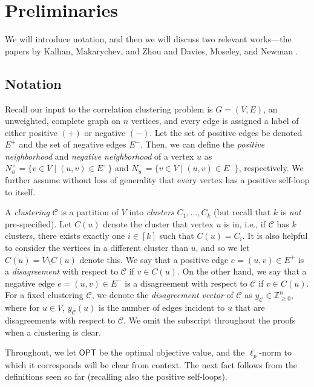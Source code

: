 \section{Preliminaries}

We will introduce notation, 
and then we will discuss two relevant works---the papers by 
Kalhan, Makarychev, and Zhou \citeyearpar{KMZ19} and Davies, Moseley, and Newman \citeyearpar{DMN23}.

\subsection{Notation} \label{sec: notation}
Recall our input to the correlation clustering problem is 
$G=(V,E)$, an unweighted, complete graph on $n$ vertices, 
and every edge is assigned a label of either positive $(+)$ or negative $(-)$.
Let the set of positive edges be denoted $E^+$ and the set of negative edges $E^-$.
Then, we can define the \emph{positive neighborhood} and \emph{negative neighborhood} of a vertex $u$ as $N_u^+ =\{v\in V \mid (u,v) \in E^+\}$ and $N_u^- =\{v\in V \mid (u,v) \in E^-\}$, respectively.
We further assume without loss of generality that every vertex has a positive self-loop to itself.

A \emph{clustering} $\mathcal{C}$ is a partition of $V$ into \emph{clusters} $C_1,\ldots,C_k$ (but recall that $k$ is \textit{not} pre-specified). 
Let $C(u)$ denote the cluster that vertex $u$ is in, i.e., if $\mathcal{C}$ has $k$ clusters, there exists exactly one $i \in [k]$ such that $C(u) = C_i$.
It is also helpful to consider the vertices in a different cluster than $u$, and so we let $\overline{C(u)} = V \setminus C(u)$ denote this.
We say that a positive edge $e=(u,v) \in E^+$ is a \emph{disagreement} with respect to $\mathcal{C}$ if $v \in \overline{C(u)}$. On the other hand, we say that a negative edge $e=(u,v) \in E^-$ is a disagreement with respect to $\mathcal{C}$ if $v \in C(u)$.
For a fixed clustering $\mathcal{C}$, we denote the \emph{disagreement vector} of $\mathcal{C}$ as $y_{\mathcal{C}} \in \mathbb{Z}_{\geq 0}^n$, where for $u \in V$, $y_{\mathcal{C}}(u)$ is the number of edges incident to $u$ that are disagreements with respect to $\mathcal{C}$. We omit the subscript throughout the proofs when a clustering is clear.

Throughout, we let $\textsf{OPT}$ be the optimal objective value, 
and the $\ell_p$-norm to which it corresponds will be clear from context.
The next fact follows from the definitions seen so far (recalling also the positive self-loops). 



